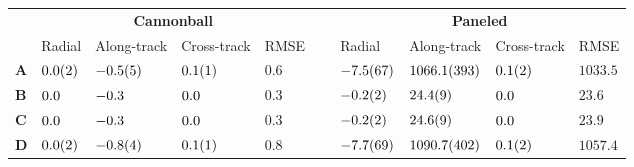 \begin{tabular}{llllllllll}
\toprule
 & \multicolumn{4}{c}{\bfseries Cannonball} & \bfseries  & \multicolumn{4}{c}{\bfseries Paneled} \\
 & Radial & Along-track & Cross-track & RMSE &  & Radial & Along-track & Cross-track & RMSE \\
\cmidrule{2-5}\cmidrule{7-10}
\bfseries A & $\num{+0.0 \pm 0.2}$ & $\num{-0.5 \pm 0.5}$ & $\num{+0.1 \pm 0.1}$ & $\num{0.6}$ & ~ & $\num{-7.5 \pm 6.7}$ & $\num{+1066.1 \pm 39.3}$ & $\num{+0.1 \pm 0.2}$ & $\num{1033.5}$ \\
\bfseries B & $\num{+0.0 \pm 0.0}$ & $\num{-0.3 \pm 0.0}$ & $\num{+0.0 \pm 0.0}$ & $\num{0.3}$ & ~ & $\num{-0.2 \pm 0.2}$ & $\num{+24.4 \pm 0.9}$ & $\num{+0.0 \pm 0.0}$ & $\num{23.6}$ \\
\bfseries C & $\num{+0.0 \pm 0.0}$ & $\num{-0.3 \pm 0.0}$ & $\num{+0.0 \pm 0.0}$ & $\num{0.3}$ & ~ & $\num{-0.2 \pm 0.2}$ & $\num{+24.6 \pm 0.9}$ & $\num{+0.0 \pm 0.0}$ & $\num{23.9}$ \\
\bfseries D & $\num{+0.0 \pm 0.2}$ & $\num{-0.8 \pm 0.4}$ & $\num{+0.1 \pm 0.1}$ & $\num{0.8}$ & ~ & $\num{-7.7 \pm 6.9}$ & $\num{+1090.7 \pm 40.2}$ & $\num{+0.1 \pm 0.2}$ & $\num{1057.4}$ \\
\bottomrule
\end{tabular}
